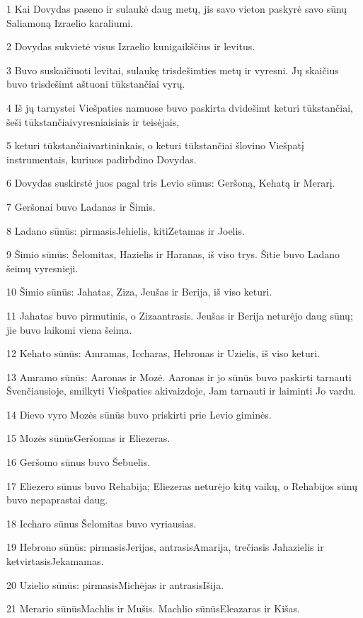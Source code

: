 \par 1 Kai Dovydas paseno ir sulaukė daug metų, jis savo vieton paskyrė savo sūnų Saliamoną Izraelio karaliumi. 
\par 2 Dovydas sukvietė visus Izraelio kunigaikščius ir levitus. 
\par 3 Buvo suskaičiuoti levitai, sulaukę trisdešimties metų ir vyresni. Jų skaičius buvo trisdešimt aštuoni tūkstančiai vyrų. 
\par 4 Iš jų tarnystei Viešpaties namuose buvo paskirta dvidešimt keturi tūkstančiai, šeši tūkstančiai­vyresniaisiais ir teisėjais, 
\par 5 keturi tūkstančiai­vartininkais, o keturi tūkstančiai šlovino Viešpatį instrumentais, kuriuos padirbdino Dovydas. 
\par 6 Dovydas suskirstė juos pagal tris Levio sūnus: Geršoną, Kehatą ir Merarį. 
\par 7 Geršonai buvo Ladanas ir Šimis. 
\par 8 Ladano sūnūs: pirmasis­Jehielis, kiti­Zetamas ir Joelis. 
\par 9 Šimio sūnūs: Šelomitas, Hazielis ir Haranas, iš viso trys. Šitie buvo Ladano šeimų vyresnieji. 
\par 10 Šimio sūnūs: Jahatas, Ziza, Jeušas ir Berija, iš viso keturi. 
\par 11 Jahatas buvo pirmutinis, o Ziza­antrasis. Jeušas ir Berija neturėjo daug sūnų; jie buvo laikomi viena šeima. 
\par 12 Kehato sūnūs: Amramas, Iccharas, Hebronas ir Uzielis, iš viso keturi. 
\par 13 Amramo sūnūs: Aaronas ir Mozė. Aaronas ir jo sūnūs buvo paskirti tarnauti Švenčiausioje, smilkyti Viešpaties akivaizdoje, Jam tarnauti ir laiminti Jo vardu. 
\par 14 Dievo vyro Mozės sūnūs buvo priskirti prie Levio giminės. 
\par 15 Mozės sūnūs­Geršomas ir Eliezeras. 
\par 16 Geršomo sūnus buvo Šebuelis. 
\par 17 Eliezero sūnus buvo Rehabija; Eliezeras neturėjo kitų vaikų, o Rehabijos sūnų buvo nepaprastai daug. 
\par 18 Iccharo sūnus Šelomitas buvo vyriausias. 
\par 19 Hebrono sūnūs: pirmasis­Jerijas, antrasis­Amarija, trečiasis­ Jahazielis ir ketvirtasis­Jekamamas. 
\par 20 Uzielio sūnūs: pirmasis­Michėjas ir antrasis­Išija. 
\par 21 Merario sūnūs­Machlis ir Mušis. Machlio sūnūs­Eleazaras ir Kišas. 
